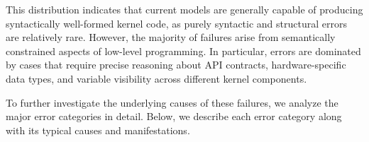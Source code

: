 
This distribution indicates that current models are generally capable of producing syntactically well-formed kernel code, as purely syntactic and structural errors are relatively rare.
However, the majority of failures arise from semantically constrained aspects of low-level programming.
In particular, errors are dominated by cases that require precise reasoning about API contracts, hardware-specific data types, and variable visibility across different kernel components.

To further investigate the underlying causes of these failures, we analyze the major error categories in detail. Below, we describe each error category along with its typical causes and manifestations.

